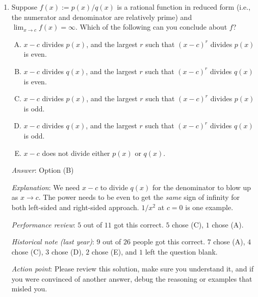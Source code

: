 \documentclass[10pt]{amsart}
\begin{document}
\begin{enumerate}
  {\em Historical note (last year)}: $10$ out of $26$ people got this
  correct. $11$ people chose (B), indicating that either they took
  $\tan(\pi/3)$ wrong, or they computed $\tan(\pi/6)$ and did not
  perform the subtraction step $\pi/2 - \pi/6$. $4$ people chose (A),
  $1$ person chose (C), and $1$ person left the question blank.
\item Suppose $f(x) := p(x)/q(x)$ is a rational function in reduced form
  (i.e., the numerator and denominator are relatively prime) and
  $\lim_{x \to c} f(x) = \infty$. Which of the following can you
  conclude about $f$?
  \begin{enumerate}[(A)]
  \item $x - c$ divides $p(x)$, and the largest $r$ such that $(x -
    c)^r$ divides $p(x)$ is even.
  \item $x - c$ divides $q(x)$, and the largest $r$ such that $(x -
    c)^r$ divides $q(x)$ is even.
  \item $x - c$ divides $p(x)$, and the largest $r$ such that $(x -
    c)^r$ divides $p(x)$ is odd.
  \item $x - c$ divides $q(x)$, and the largest $r$ such that $(x -
    c)^r$ divides $q(x)$ is odd.
  \item $x - c$ does not divide either $p(x)$ or $q(x)$.
  \end{enumerate}

  {\em Answer}: Option (B)

  {\em Explanation}: We need $x - c$ to divide $q(x)$ for the
  denominator to blow up as $x \to c$. The power needs to be even to
  get the {\em same} sign of infinity for both left-sided and
  right-sided approach. $1/x^2$ at $c = 0$ is one example.

  {\em Performance review}: $5$ out of $11$ got this correct. $5$
  chose (C), $1$ chose (A).

  {\em Historical note (last year)}: $9$ out of $26$ people got this
  correct. $7$ chose (A), $4$ chose (C), $3$ chose (D), $2$ chose (E),
  and $1$ left the question blank.

  {\em Action point}: Please review this solution, make sure you
  understand it, and if you were convinced of another answer, debug
  the reasoning or examples that misled you.


\end{enumerate}
\end{document}
